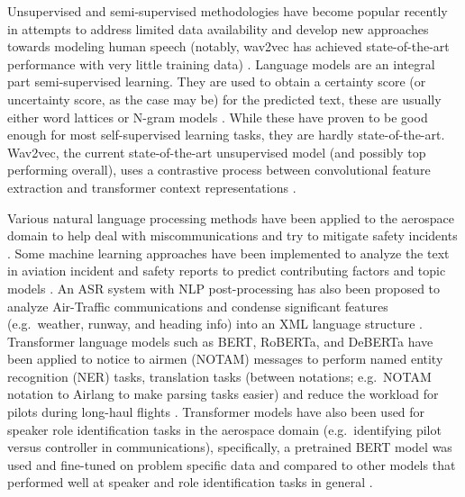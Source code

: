 \documentclass[10pt]{article}
\begin{document}
        Unsupervised and semi-supervised methodologies have become popular recently in attempts to address limited data availability
        and develop new approaches towards modeling human speech (notably, wav2vec has achieved state-of-the-art performance with
        very little training data)
        \cite{baevski_wav2vec_2020,badrinath_automatic_2022,srinivasamurthy_semi-supervised_2017,zuluaga-gomez_contextual_2021}.
        Language models are an integral part semi-supervised learning. They are used to obtain a certainty score (or uncertainty
        score, as the case may be) for the predicted text, these are usually either word lattices or N-gram models
        \cite{badrinath_automatic_2022,srinivasamurthy_semi-supervised_2017,zuluaga-gomez_contextual_2021}.
        While these have proven to be good enough for most self-supervised learning tasks, they are hardly state-of-the-art.
        Wav2vec, the current state-of-the-art unsupervised model (and possibly top performing overall), uses a contrastive process
        between convolutional feature extraction and transformer context representations \cite{baevski_wav2vec_2020}.


        Various natural language processing methods have been applied to the aerospace domain to help deal with miscommunications
        and try to mitigate safety incidents \cite{ragnarsdottir_language_2003,tanguy_natural_2016,madeira_machine_2021}.
        Some machine learning approaches have been implemented to analyze the text in aviation incident and safety reports to predict
        contributing factors and topic models \cite{tanguy_natural_2016,madeira_machine_2021}. An ASR system with NLP post-processing
        has also been proposed to analyze Air-Traffic communications and condense significant features (e.g.~weather, runway, and
        heading info) into an XML language structure \cite{ragnarsdottir_language_2003}. Transformer language models such as BERT,
        RoBERTa, and DeBERTa have been applied to notice to airmen (NOTAM) messages to perform named entity recognition (NER) tasks,
        translation tasks (between notations; e.g.~NOTAM notation to Airlang to make parsing tasks easier) and reduce the workload
        for pilots during long-haul flights \cite{arnold_knowledge_2022}. Transformer models have also been used for speaker role
        identification tasks in the aerospace domain (e.g.~identifying pilot versus controller in communications), specifically,
        a pretrained BERT model was used and fine-tuned on problem specific data and compared to other models that performed
        well at speaker and role identification tasks in general \cite{guo_comparative_2022}.
\end{document}
